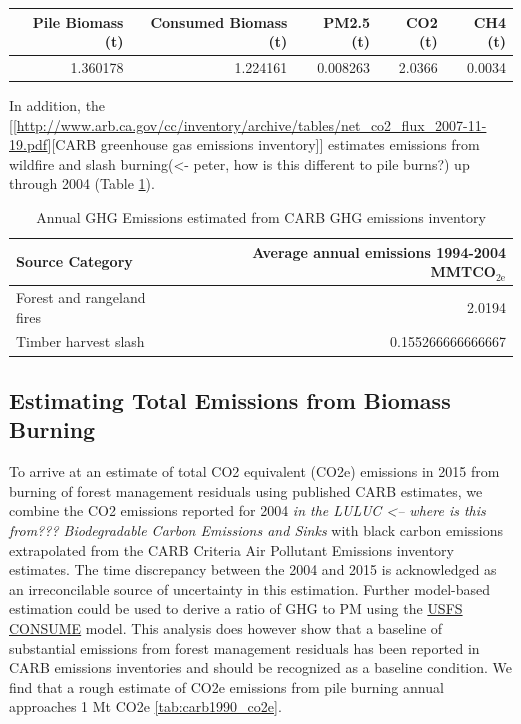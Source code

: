 \documentclass[a4paper]{article}
\begin{document}
\begin{center}
\begin{tabular}{rrrrr}
Pile Biomass (t) & Consumed Biomass (t) & PM2.5 (t) & CO2 (t) & CH4 (t)\\
\hline
1.360178 & 1.224161 & 0.008263 & 2.0366 & 0.0034\\
\end{tabular}
\end{center}
In addition, the
[[\url{http://www.arb.ca.gov/cc/inventory/archive/tables/net_co2_flux_2007-11-19.pdf}][CARB
greenhouse gas emissions inventory]] estimates emissions from
wildfire and slash burning(<- peter, how is this different to pile burns?) up through 2004 (Table \ref{arb_ghg_2004}).
\begin{table}[htb]
\caption{Annual GHG Emissions estimated from CARB GHG emissions inventory \label{arb_ghg_2004}}
\centering
\begin{tabular}{lr}
Source Category & Average annual emissions 1994-2004 MMTCO$_{\text{2e}}$\\
\hline
Forest and rangeland fires & 2.0194\\
Timber harvest slash & 0.155266666666667\\
\end{tabular}
\end{table}

\subsection{Estimating Total Emissions from Biomass Burning}
\label{sec-2-3}
To arrive at an estimate of total CO2 equivalent (CO2e) emissions in 2015 from burning of forest
management residuals using published CARB
estimates, we combine the CO2 emissions reported for 2004 \emph{\emph{\emph{in the
LULUC <-- where is this from??? Biodegradable Carbon Emissions and Sinks}}} with black carbon
emissions extrapolated from the CARB Criteria Air Pollutant Emissions
inventory estimates. The time discrepancy between the 2004 and 2015 is
acknowledged as an irreconcilable source of uncertainty in this
estimation. Further model-based estimation could be used to derive a
ratio of GHG to PM using the \href{http://www.fs.fed.us/pnw/fera/research/smoke/consume/index.shtml}{USFS CONSUME} model. This analysis does however show that a baseline of
substantial emissions from forest management residuals has been reported
in CARB emissions inventories and should be recognized as a baseline
condition. We find that a rough estimate of CO2e emissions from pile
burning annual approaches 1 Mt CO2e \ref{tab:carb1990_co2e}.
\end{document}
